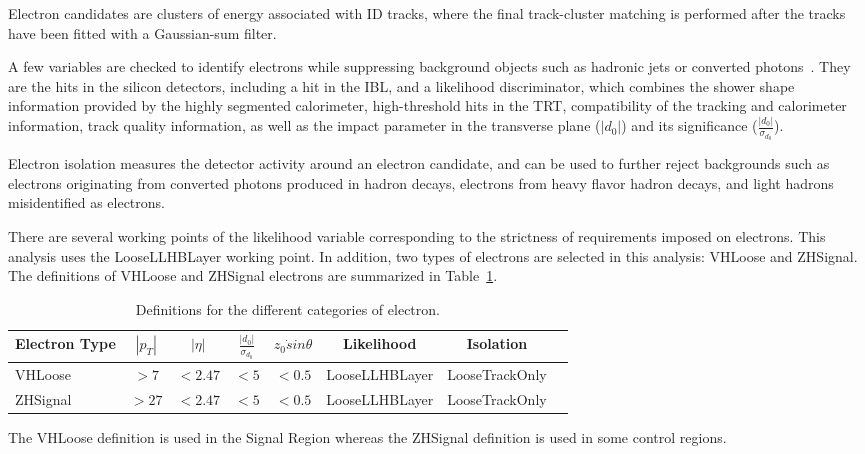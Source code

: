 \par Electron candidates are clusters of energy associated with ID tracks, 
where the final track-cluster matching is performed after the tracks have been fitted with a Gaussian-sum filter.
\par A few variables are checked to identify electrons while suppressing background objects 
such as hadronic jets or converted photons~\cite{ATL-PHYS-PUB-2015-041}. 
They are the hits in the silicon detectors, including a hit in the IBL, and a likelihood discriminator, 
which combines the shower shape information provided by the highly segmented calorimeter, high-threshold hits in the TRT, 
compatibility of the tracking and calorimeter information, track quality information, 
as well as the impact parameter in the transverse plane ($|d_0|$) and its significance ($\frac{|d_0|}{\sigma_{d_0}}$).
\par Electron isolation measures the detector activity around an electron candidate, 
and can be used to further reject backgrounds such as electrons originating from converted photons produced in hadron decays, 
electrons from heavy flavor hadron decays, and light hadrons misidentified as electrons.
\par There are several working points of the likelihood variable corresponding to the strictness of requirements imposed on electrons. 
This analysis uses the LooseLLHBLayer working point. 
In addition, two types of electrons are selected in this analysis: VHLoose and ZHSignal. The definitions of VHLoose and ZHSignal electrons are summarized in Table~\ref{tab:el}.

\begin{table}[tbh]
    \centering
    \begin{tabular}{|l|c|c|c|c|c|c|c}
        \hline
        Electron Type & $|p_T|$ & $|\eta|$ & $\frac{|d_0|}{\sigma_{d_0}}$ & $z_0\dot sin\theta$ & Likelihood & Isolation \\
        \hline
        VHLoose &$>7$&$<2.47$&$<5$&$<0.5$&LooseLLHBLayer&LooseTrackOnly \\
        \hline
        ZHSignal&$>27$&$<2.47$&$<5$&$<0.5$&LooseLLHBLayer&LooseTrackOnly \\
        \hline
    \end{tabular}
    \caption{Definitions for the different categories of electron.}
    \label{tab:el}
\end{table}

\par The VHLoose definition is used in the Signal Region whereas the ZHSignal definition is used in some control regions.
 

